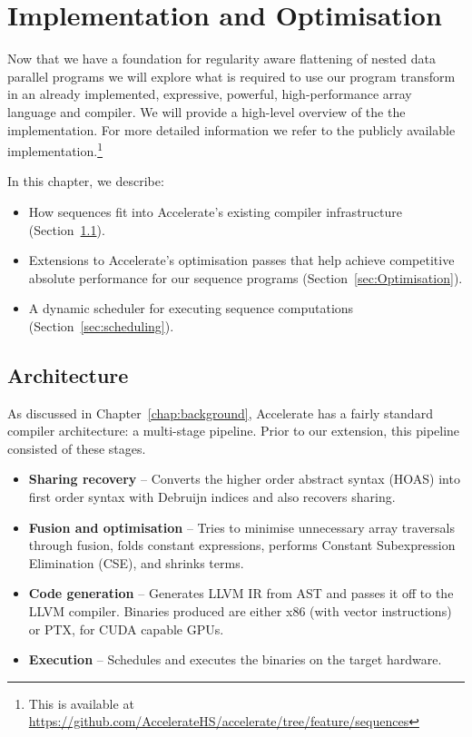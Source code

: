 \chapter{Implementation and Optimisation}
\label{chap:implementation}

Now that we have a foundation for regularity aware flattening of nested data parallel programs we will explore what is required to use our program transform in an already implemented, expressive, powerful, high-performance array language and compiler. We will provide a high-level overview of the the implementation. For more detailed information we refer to the publicly available implementation.\footnote{This is available at \url{https://github.com/AccelerateHS/accelerate/tree/feature/sequences}}

In this chapter, we describe:
\begin{itemize}
\item How sequences fit into Accelerate's existing compiler infrastructure (Section~\ref{sec:seq-architecture}).
\item Extensions to Accelerate's optimisation passes that help achieve competitive absolute performance for our sequence programs (Section~\ref{sec:Optimisation}).
\item A dynamic scheduler for executing sequence computations (Section~\ref{sec:scheduling}).
\end{itemize}

\section{Architecture}
\label{sec:seq-architecture}
As discussed in Chapter~\ref{chap:background}, Accelerate has a fairly standard compiler architecture: a multi-stage pipeline. Prior to our extension, this pipeline consisted of these stages.

\begin{itemize}
%
\item \textbf{Sharing recovery} -- Converts the higher order abstract syntax (HOAS) into first order syntax with Debruijn indices and also recovers sharing.
%
%
\item \textbf{Fusion and optimisation} -- Tries to minimise unnecessary array traversals through fusion, folds constant expressions, performs Constant Subexpression Elimination (CSE), and shrinks terms.
%
\item \textbf{Code generation} -- Generates LLVM IR from AST and passes it off to the LLVM compiler. Binaries produced are either x86 (with vector instructions) or PTX, for CUDA capable GPUs.
%
\item \textbf{Execution} -- Schedules and executes the binaries on the target hardware.
\end{itemize}

